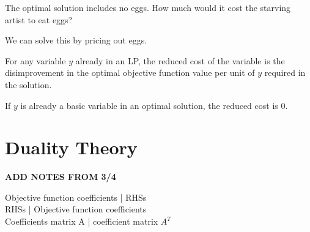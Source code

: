 \documentclass{article}
\begin{document}
The optimal solution includes no eggs. How much would it cost the starving artist to 
eat eggs?

We can solve this by pricing out eggs.

\begin{definition}
    For any variable \(y\) already in an LP, the reduced cost of the variable is 
    the disimprovement in the optimal objective function value per unit of \(y\) required in 
    the solution.   
\end{definition}

\begin{remark}
    If \(y\) is already a basic variable in an optimal solution, the reduced cost is 0. 
\end{remark}

\section{Duality Theory}
\textbf{ADD NOTES FROM 3/4}

    Objective function coefficients | RHSs\\
    RHSs | Objective function coefficients \\
    Coefficients matrix A | coefficient matrix \(A^T\) \\
\end{document}
